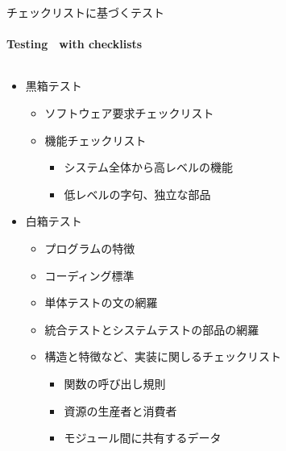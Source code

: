 
\begin{frame}[shrink=10]{チェックリストに基づくテスト}
\framesubtitle{Testing　with checklists}
\begin{columns}[t]
    \begin{column}{.6\textwidth}
    \begin{itemize}
    \item 黒箱テスト
        \begin{itemize}
        \item ソフトウェア要求チェックリスト
        \item 機能チェックリスト
            \begin{itemize}
            \item システム全体から高レベルの機能
            \item 低レベルの字句、独立な部品
            \end{itemize}
        \end{itemize}
    \item 白箱テスト
        \begin{itemize}
        \item プログラムの特徴
        \item コーディング標準
        \item 単体テストの文の網羅
        \item 統合テストとシステムテストの部品の網羅
        \item 構造と特徴など、実装に関しるチェックリスト
            \begin{itemize}
            \item 関数の呼び出し規則
            \item 資源の生産者と消費者
            \item モジュール間に共有するデータ
            \end{itemize}
        \end{itemize}
    \end{itemize}
    \end{column}
        \begin{column}{.35\textwidth}
        \begin{figure}

\end{figure}
\end{column}
\end{columns}
\end{frame}
